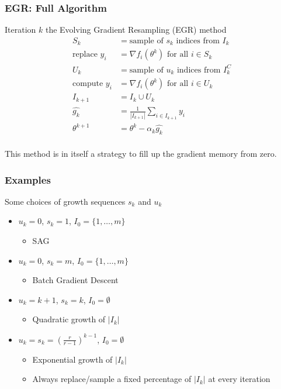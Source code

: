 \documentclass{beamer}
\begin{document}
		
	 		\begin{frame}
	 			\frametitle{EGR: Full Algorithm}

		\begin{block}{Iteration $k$ the Evolving Gradient Resampling (EGR) method}
	 	\begin{align*}
		S_k &=  \mbox{sample of } s_k \mbox{ indices from } I_{k}\\
		\mbox{replace } y_i &= \nabla f_i(\theta^k) \mbox{ for all } i \in S_k \\
		U_k &=  \mbox{sample of } u_k \mbox{ indices from }  I_{k}^C\\
		\mbox{compute } y_i &= \nabla f_i(\theta^k) \mbox{ for all } i \in U_k \\
		I_{k+1} &=  I_{k} \cup U_k\\
		\hat{g_k} & = \frac{1}{| I_{k+1} | } \sum_{i \in I_{k+1}} y_i \\ 
	   	\theta^{k+1} &= \theta^k - \alpha_k \hat{g_k}\\
	 	\end{align*}
		\end{block}
		This method is in itself a strategy to fill up the gradient memory from zero.
	 	    \end{frame}
		
		
		\begin{frame}
			\frametitle{Examples}
			
			Some choices of growth sequences $s_k$ and $u_k$ 
			
				
			\begin{itemize}
	\pause
				\item $u_k=0$, $s_k=1$, $I_0=\{1,\ldots,m\}$
				\begin{itemize}
					\item SAG
				\end{itemize}
	
	\pause
				\item $u_k=0$, $s_k=m$, $I_0=\{1,\ldots,m\}$
				\begin{itemize}
					\item Batch Gradient Descent
				\end{itemize}
	
	\pause
				\item $u_k=k+1$, $s_k=k$, $I_0=\emptyset$
				\begin{itemize}
					\item Quadratic growth of $|I_k|$
				\end{itemize}
	
	\pause
				\item $u_k=s_k=\left(\frac{r}{r-1}\right)^{k-1}$, $I_0=\emptyset$
				\begin{itemize}
					\item Exponential growth of $|I_k|$
					\item Always replace/sample a fixed percentage of $|I_k|$ at every iteration
				\end{itemize}
	
			\end{itemize}

	    \end{frame}
\end{document}
